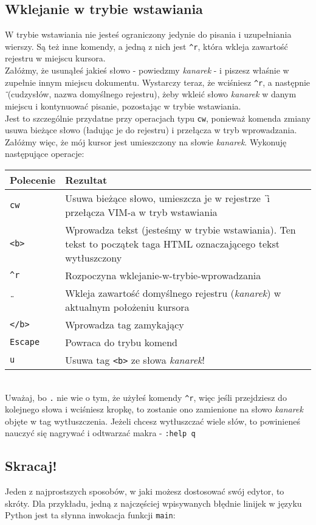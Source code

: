 \documentclass[a4paper,12pt]{article}
\begin{document}
\subsection{Wklejanie w trybie wstawiania}
W trybie wstawiania nie jesteś ograniczony jedynie do pisania i uzupełniania wierszy. Są też inne komendy, a jedną z nich jest {\tt \^{}r}, która wkleja zawartość rejestru w miejscu kursora.\\
Załóżmy, że usunąłeś jakieś słowo - powiedzmy {\it kanarek} - i piszesz właśnie w zupełnie innym miejscu dokumentu. Wystarczy teraz, że wciśniesz {\tt \^{}r}, a następnie {\tt \"{}} (cudzysłów, nazwa domyślnego rejestru), żeby wkleić słowo {\it kanarek} w danym miejscu i kontynuować pisanie, pozostając w trybie wstawiania.\\
Jest to szczególnie przydatne przy operacjach typu {\tt cw}, ponieważ komenda zmiany usuwa bieżące słowo (ładując je do rejestru) i przełącza w tryb wprowadzania. Załóżmy więc, że mój kursor jest umieszczony na słowie {\it kanarek}. Wykonuję następujące operacje:

\begin{tabular}{ l | p{} }
{\bf Polecenie} & {\bf Rezultat} \\ \hline
{\tt cw} & Usuwa bieżące słowo, umieszcza je w rejestrze {\tt \"{}} i przełącza VIM-a w tryb wstawiania \\
{\tt <b>} & Wprowadza tekst (jesteśmy w trybie wstawiania). Ten tekst to początek taga HTML oznaczającego tekst wytłuszczony\\ 
{\tt \^{}r} & Rozpoczyna wklejanie-w-trybie-wprowadzania \\
{\tt \"{}} & Wkleja zawartość domyślnego rejestru ({\it kanarek}) w aktualnym położeniu kursora\\
{\tt </b>} & Wprowadza tag zamykający\\ 
{\tt Escape} & Powraca do trybu komend \\
{\tt u} & Usuwa tag {\tt <b>} ze słowa {\it kanarek}!\\ \hline
\end{tabular}\\

\noindent
Uważaj, bo {\tt .} nie wie o tym, że użyłeś komendy {\tt \^{}r}, więc jeśli przejdziesz do kolejnego słowa i wciśniesz kropkę, to zostanie ono zamienione na słowo {\it kanarek} objęte w tag wytłuszczenia. Jeżeli chcesz wytłuszczać wiele słów, to powinieneś nauczyć się nagrywać i odtwarzać makra - {\tt :help q}
\subsection{Skracaj!}
Jeden z najprostszych sposobów, w jaki możesz dostosować swój edytor, to skróty. Dla przykładu, jedną z najczęściej wpisywanych błędnie linijek w języku Python jest ta słynna inwokacja funkcji {\tt main}:
\end{document}
